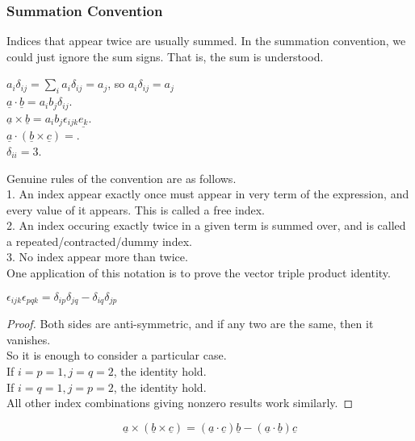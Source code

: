 \subsubsection{Summation Convention}
Indices that appear twice are usually summed.
In the summation convention, we could just ignore the sum signs.
That is, the sum is understood.
\begin{example}
    $a_i\delta_{ij}=\sum_ia_i\delta_{ij}=a_j$, so $a_i\delta_{ij}=a_j$\\
    $\underline{a}\cdot\underline{b}=a_ib_j\delta_{ij}$.\\
    $\underline{a}\times\underline{b}=a_ib_j\epsilon_{ijk}\underline{e_k}$.\\
    $\underline{a}\cdot(\underline{b}\times\underline{c})=$.\\
    $\delta_{ii}=3$.
\end{example}
Genuine rules of the convention are as follows.\\
1. An index appear exactly once must appear in very term of the expression, and every value of it appears.
This is called a free index.\\
2. An index occuring exactly twice in a given term is summed over, and is called a repeated/contracted/dummy index.\\
3. No index appear more than twice.\\
One application of this notation is to prove the vector triple product identity.
\begin{lemma}
    $\epsilon_{ijk}\epsilon_{pqk}=\delta_{ip}\delta_{jq}-\delta_{iq}\delta_{jp}$
\end{lemma}
\begin{proof}
    Both sides are anti-symmetric, and if any two are the same, then it vanishes.\\
    So it is enough to consider a particular case.\\
    If $i=p=1,j=q=2$, the identity hold.\\
    If $i=q=1,j=p=2$, the identity hold.\\
    All other index combinations giving nonzero results work similarly.
\end{proof}
\begin{proposition}
    $$\underline{a}\times(\underline{b}\times\underline{c})=(\underline{a}\cdot\underline{c})\underline{b}-(\underline{a}\cdot\underline{b})\underline{c}$$
\end{proposition}
